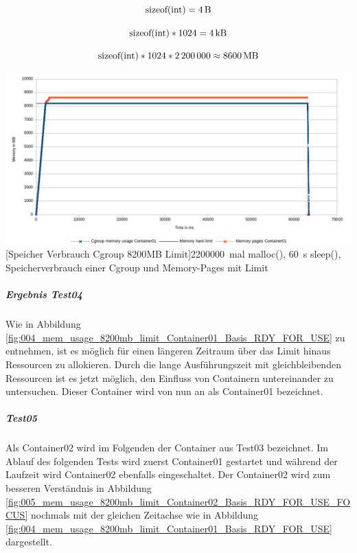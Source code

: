 \[\mathrm{sizeof(int)} = \SI{4}{\byte}\]

\[\mathrm{sizeof(int)} * \SI{1024}{} = \SI{4}{\kilo\byte}\]

\[\mathrm{sizeof(int)} * \SI{1024}{} * \SI{2200000}{} \approx \SI{8600}{\mega\byte} \]


\vspace{1em}
\begin{minipage}{\linewidth}
	\centering
	\includegraphics[width=1\linewidth]{pics/004_mem_usage_8200mb_limit_Container01_Basis_RDY_FOR_USE.png}
	[Speicher Verbrauch Cgroup 8200MB Limit]{\SI{2200000}{mal} malloc(), \SI{60}{\second} sleep(), Speicherverbrauch einer Cgroup und Memory-Pages mit Limit}
	\label{fig:004_mem_usage_8200mb_limit_Container01_Basis_RDY_FOR_USE}
\end{minipage}

\subparagraph{Ergebnis Test04}
Wie in Abbildung \ref{fig:004_mem_usage_8200mb_limit_Container01_Basis_RDY_FOR_USE} zu entnehmen, ist es möglich für einen längeren Zeitraum über das Limit hinaus Ressourcen zu allokieren. Durch die lange Ausführungszeit mit gleichbleibenden Ressourcen ist es jetzt möglich, den Einfluss von Containern untereinander zu untersuchen. Dieser Container wird von nun an als Container01 bezeichnet.

\subparagraph{Test05}
Als Container02 wird im Folgenden der Container aus Test03 bezeichnet. Im Ablauf des folgenden Tests wird zuerst Container01 gestartet und während der Laufzeit wird Container02 ebenfalls eingeschaltet. Der Container02 wird zum besseren Verständnis in Abbildung \ref{fig:005_mem_usage_8200mb_limit_Container02_Basis_RDY_FOR_USE_FOCUS} nochmals mit der gleichen Zeitachse wie in Abbildung \ref{fig:004_mem_usage_8200mb_limit_Container01_Basis_RDY_FOR_USE} dargestellt. 


